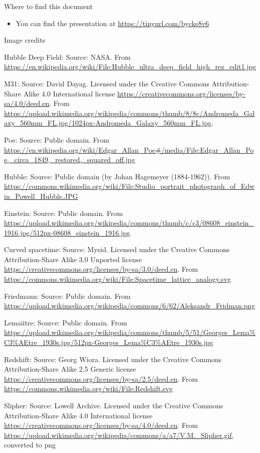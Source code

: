 \documentclass[usenames,dvipsnames,12pt,compress]{beamer}
\begin{document}
\begin{frame}{Where to find this document}
  \begin{itemize}
  \item{You can find the presentation at \alert{\url{https://tinyurl.com/bycke8v6}}}
  \end{itemize}
\end{frame}


\begin{frame}{Image credits}
  \begin{enumerate}
  \tiny {
  \item{Hubble Deep Field: Source: NASA. From \url{https://en.wikipedia.org/wiki/File:Hubble_ultra_deep_field_high_rez_edit1.jpg}}
  \item{M31: Source: David Dayag. Licensed under the Creative Commons Attribution-Share Alike 4.0 International license \url{https://creativecommons.org/licenses/by-sa/4.0/deed.en}. From \url{https://upload.wikimedia.org/wikipedia/commons/thumb/8/8c/Andromeda_Galaxy_560mm_FL.jpg/1024px-Andromeda_Galaxy_560mm_FL.jpg}.}
  \item{Poe: Source: Public domain. From \url{https://en.wikipedia.org/wiki/Edgar_Allan_Poe\#/media/File:Edgar_Allan_Poe,_circa_1849,_restored,_squared_off.jpg}}
  \item{Hubble: Source: Public domain (by Johan Hagemeyer (1884-1962)). From \url{https://commons.wikimedia.org/wiki/File:Studio_portrait_photograph_of_Edwin_Powell_Hubble.JPG}}
  \item{Einstein: Source: Public domain. From \url{https://upload.wikimedia.org/wikipedia/commons/thumb/c/c3/08608_einstein_1916.jpg/512px-08608_einstein_1916.jpg}}
  \item{Curved spacetime: Source: Mysid. Licensed under the Creative Commons Attribution-Share Alike 3.0 Unported license \url{https://creativecommons.org/licenses/by-sa/3.0/deed.en}. From \url{https://commons.wikimedia.org/wiki/File:Spacetime_lattice_analogy.svg}}
  \item{Friedmann: Source: Public domain. From \url{https://upload.wikimedia.org/wikipedia/commons/6/62/Aleksandr_Fridman.png}}
  \item{Lemaiitre: Source: Public domain. From \url{https://upload.wikimedia.org/wikipedia/commons/thumb/5/51/Georges_Lema\%C3\%AEtre_1930s.jpg/512px-Georges_Lema\%C3\%AEtre_1930s.jpg}}  
  \item{Redshift: Source: Georg Wiora. Licensed under the Creative Commons Attribution-Share Alike 2.5 Generic license \url{https://creativecommons.org/licenses/by-sa/2.5/deed.en}. From \url{https://commons.wikimedia.org/wiki/File:Redshift.svg}}
  \item{Slipher: Source: Lowell Archive. Licensed under the Creative Commons Attribution-Share Alike 4.0 International license \url{https://creativecommons.org/licenses/by-sa/4.0/deed.en}. From \url{https://upload.wikimedia.org/wikipedia/commons/a/a7/V.M._Slipher.gif}, converted to png}  
  } %
  \end{enumerate}
\end{frame}
\end{document}
